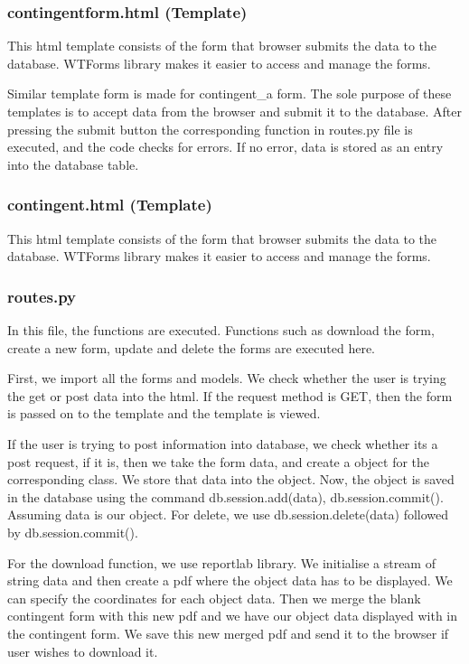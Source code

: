 \documentclass[journal,12pt,twocolumn]{IEEEtran}
\begin{document}
\subsubsection{\textbf{contingentform.html (Template)}}
This html template consists of the form that browser submits the data to the database. WTForms library makes it easier to access and manage the forms. \par
Similar template form is made for contingent\_a form. The sole purpose of these templates is to accept data from the browser and submit it to the database. After pressing the submit button the corresponding function in routes.py file is executed, and the code checks for errors. If no error, data is stored as an entry into the database table.
\subsubsection{\textbf{contingent.html (Template)}}
This html template consists of the form that browser submits the data to the database. WTForms library makes it easier to access and manage the forms.

\subsubsection{\textbf{routes.py}}
In this file, the functions are executed. Functions such as download the form, create a new form, update and delete the forms are executed here. \par
First, we import all the forms and models. We check whether the user is trying the get or post data into the html. If the request method is GET, then the form is passed on to the template and the template is viewed. \par

If the user is trying to post information into database, we check whether its a post request, if it is, then we take the form data, and create a object for the corresponding class. We store that data into the object. Now, the object is saved in the database using the command db.session.add(data), db.session.commit(). Assuming data is our object. For delete, we use db.session.delete(data) followed by db.session.commit(). \par

For the download function, we use reportlab library. We initialise a stream of string data and then create a pdf where the object data has to be displayed. We can specify the coordinates for each object data. Then we merge the blank contingent form with this new pdf and we have our object data displayed with in the contingent form. We save this new merged pdf and send it to the browser if user wishes to download it. \par 
\end{document}
